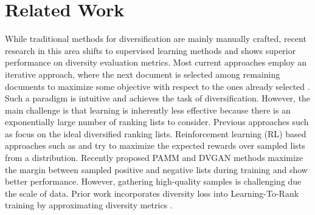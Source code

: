 \section{Related Work}
\vspace{-0.10in}
While traditional methods for diversification are mainly manually crafted, recent research in this area shifts to supervised learning methods and shows superior performance on diversity evaluation metrics. Most current approaches employ an iterative approach, where the next document is selected among remaining documents to maximize some objective with respect to the ones already selected \cite{ResDivSearchReco}. Such a paradigm is intuitive and achieves the task of diversification. However, the main challenge is that learning is inherently less effective because there is an exponentially large number of ranking lists to consider.
Previous approaches such as \cite{R-LTR} focus on the ideal diversified ranking lists. Reinforcement learning (RL) based approaches such as \cite{divRankPolicyNets} and \cite{mdpSearchDiversify} try to maximize the expected rewards over sampled lists from a distribution. Recently proposed PAMM \cite{MMRSearchRelevanceDivMeasures} and DVGAN \cite{liu2020dvgan} methods maximize the margin between sampled positive and negative lists during training and show better performance. However, gathering high-quality samples is challenging due the scale of data. Prior work incorporates diversity loss into Learning-To-Rank training by approximating diversity metrics \cite{DALeToR}.